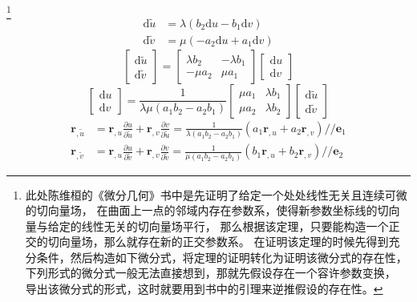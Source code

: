 \footnote{此处陈维桓的《微分几何》书中是先证明了给定一个处处线性无关且连续可微的切向量场，
在曲面上一点的邻域内存在参数系，使得新参数坐标线的切向量与给定的线性无关的切向量场平行，
那么根据该定理，只要能构造一个正交的切向量场，那么就存在新的正交参数系。
在证明该定理的时候先得到充分条件，然后构造如下微分式，将定理的证明转化为证明该微分式的存在性，
下列形式的微分式一般无法直接想到，那就先假设存在一个容许参数变换，
导出该微分式的形式，这时就要用到书中的引理来逆推假设的存在性。}
\begin{equation*}
    \begin{aligned}
    \mathrm{d}\tilde{u} &=\lambda\left(b_{2}\mathrm{d}u-b_{1}\mathrm{d}v\right)\\
    \mathrm{d}\tilde{v} &=\mu\left(-a_{2}\mathrm{d}u+a_{1}\mathrm{d}v\right)
    \end{aligned}
\end{equation*}
\begin{equation*}
    \left[\begin{array}{c}
        \mathrm{d}\tilde{u} \\ \mathrm{d}\tilde{v}
    \end{array}\right] = \left[\begin{array}{cc}
        \lambda b_{2} & -\lambda b_{1} \\ -\mu a_{2} & \mu a_{1}
    \end{array}\right]\left[\begin{array}{c}
        \mathrm{d}u \\ \mathrm{d}v
    \end{array}\right]
\end{equation*}
\begin{equation*}
    \left[\begin{array}{c}
        \mathrm{d}u \\ \mathrm{d}v
    \end{array}\right] = \frac{1}{\lambda\mu\left(a_{1}b_{2}-a_{2}b_{1}\right)}\left[\begin{array}{cc}
        \mu a_{1} & \lambda b_{1} \\ \mu a_{2} & \lambda b_{2}
    \end{array}\right]\left[\begin{array}{c}
        \mathrm{d}\tilde{u} \\ \mathrm{d}\tilde{v}
    \end{array}\right]
\end{equation*}
\begin{equation*}
    \begin{aligned}
        \mathbf{r}_{,\tilde{u}} &= \mathbf{r}_{,u}\frac{\partial u}{\partial\tilde{u}} + \mathbf{r}_{,v}\frac{\partial v}{\partial\tilde{u}}
        =\frac{1}{\lambda\left(a_{1}b_{2}-a_{2}b_{1}\right)}\left(a_{1}\mathbf{r}_{,u}+a_{2}\mathbf{r}_{,v}\right) // \mathbf{e}_{1} \\
        \mathbf{r}_{,\tilde{v}} &= \mathbf{r}_{,u}\frac{\partial u}{\partial\tilde{v}} + \mathbf{r}_{,v}\frac{\partial v}{\partial\tilde{v}}
        =\frac{1}{\mu\left(a_{1}b_{2}-a_{2}b_{1}\right)}\left(b_{1}\mathbf{r}_{,u}+b_{2}\mathbf{r}_{,v}\right) // \mathbf{e}_{2}
    \end{aligned}
\end{equation*}
